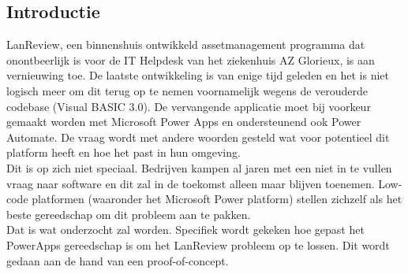 \documentclass[a0,portrait]{a0poster}
\begin{document}
\begin{multicols}{2}
\color{HoGentAccent1} 
\section*{Introductie}
\color{black}
\color{black}
LanReview, een binnenshuis ontwikkeld assetmanagement programma dat onontbeerlijk is voor de IT Helpdesk van het ziekenhuis AZ Glorieux, is aan vernieuwing toe. De laatste ontwikkeling is van enige tijd geleden en het is niet logisch meer om dit terug op te nemen voornamelijk wegens de verouderde codebase (Visual BASIC 3.0). De vervangende applicatie moet bij voorkeur gemaakt worden met Microsoft Power Apps en ondersteunend ook Power Automate. De vraag wordt met andere woorden gesteld wat voor potentieel dit platform heeft en hoe het past in hun omgeving.\\
Dit is op zich niet speciaal. Bedrijven kampen al jaren met een niet in te vullen vraag naar software en dit zal in de toekomst alleen maar blijven toenemen. Low-code platformen (waaronder het Microsoft Power platform) stellen zichzelf als het beste gereedschap om dit probleem aan te pakken.\\
Dat is wat onderzocht zal worden. Specifiek wordt gekeken hoe gepast het PowerApps gereedschap is om het LanReview probleem op te lossen. Dit wordt gedaan aan de hand van een proof-of-concept.



\color{Black} %
\color{HoGentAccent1} 

\end{multicols}
\end{document}
